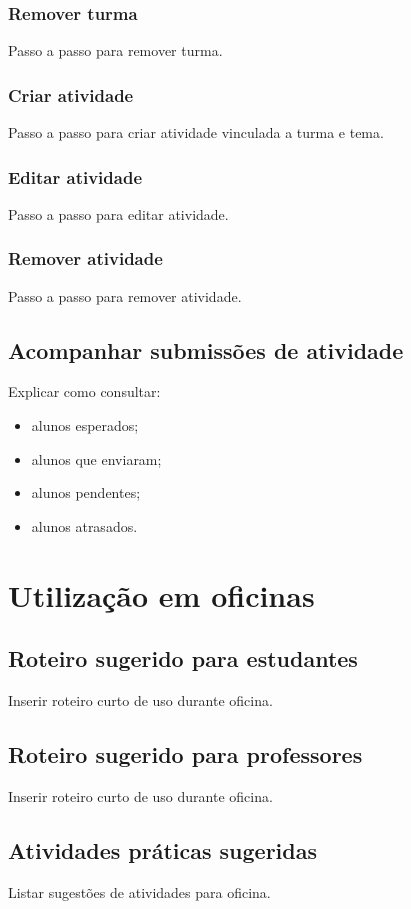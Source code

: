 \documentclass[12pt,a4paper]{article}
\begin{document}
\subsubsection{Remover turma}
Passo a passo para remover turma.

\subsubsection{Criar atividade}
Passo a passo para criar atividade vinculada a turma e tema.

\subsubsection{Editar atividade}
Passo a passo para editar atividade.

\subsubsection{Remover atividade}
Passo a passo para remover atividade.

\subsection{Acompanhar submissões de atividade}
Explicar como consultar:
\begin{itemize}
    \item alunos esperados;
    \item alunos que enviaram;
    \item alunos pendentes;
    \item alunos atrasados.
\end{itemize}

\section{Utilização em oficinas}

\subsection{Roteiro sugerido para estudantes}
Inserir roteiro curto de uso durante oficina.

\subsection{Roteiro sugerido para professores}
Inserir roteiro curto de uso durante oficina.

\subsection{Atividades práticas sugeridas}
Listar sugestões de atividades para oficina.
\end{document}
